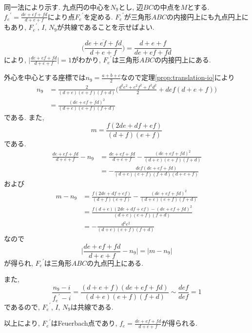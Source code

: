 \begin{prff*}
同一法により示す.
九点円の中心を$N_9$とし, 辺$BC$の中点を$M$とする.
${f_e}^\prime=\frac{de+ef+fd}{d+e+f}$により点${F_e}^\prime$を定める.
${F_e}^\prime$が三角形$ABC$の内接円上にも九点円上にもあり, ${F_e}^\prime$, $I$, $N_9$が共線であることを示せばよい.

\[\overline{\biggl(\frac{de+ef+fd}{d+e+f}\biggr)}=\frac{d+e+f}{de+ef+fd}\]
により, $\lvert\frac{de+ef+fd}{d+e+f}\rvert=1$がわかり, ${F_e}^\prime$は三角形$ABC$の内接円上にある.

外心を中心とする座標では$n_9=\frac{a+b+c}{2}$なので定理\ref{prop:translation-io}により
\begin{align*}
n_9
&=\frac{2}{(d+e)(e+f)(f+d)}\biggl(\frac{d^2e^2+e^2f^2+f^2d^2}{2}+def(d+e+f)\biggr)\\
&=\frac{(de+ef+fd)^2}{(d+e)(e+f)(f+d)}
\end{align*}
である.
また,
\[m=\frac{f(2de+df+ef)}{(d+f)(e+f)}\]
である.
\begin{align*}
\frac{de+ef+fd}{d+e+f}-n_9
&=\frac{de+ef+fd}{d+e+f}-\frac{(de+ef+fd)^2}{(d+e)(e+f)(f+d)}\\
&=-\frac{def(de+ef+fd)}{(d+e)(e+f)(f+d)(d+e+f)}
\end{align*}
および
\begin{align*}
m-n_9
&=\frac{f(2de+df+ef)}{(d+f)(e+f)}-\frac{(de+ef+fd)^2}{(d+e)(e+f)(f+d)}\\
&=\frac{f(d+e)(2de+df+ef)-(de+ef+fd)^2}{(d+e)(e+f)(f+d)}\\
&=-\frac{d^2e^2}{(d+e)(e+f)(f+d)}
\end{align*}
なので
\[\biggl\lvert\frac{de+ef+fd}{d+e+f}-n_9\biggr\rvert=\lvert m-n_9\rvert\]
が得られ, ${F_e}^\prime$は三角形$ABC$の九点円上にある.

また,
\[\frac{n_9-i}{{f_e}^\prime-i}=\frac{(d+e+f)(de+ef+fd)}{(d+e)(e+f)(f+d)}\sim\frac{def}{def}=1\]
であるので, ${F_e}^\prime$, $I$, $N_9$は共線である.

以上により, ${F_e}^\prime$はFeuerbach点であり, $f_e=\frac{de+ef+fd}{d+e+f}$が得られる.
\end{prff*}
%
%
